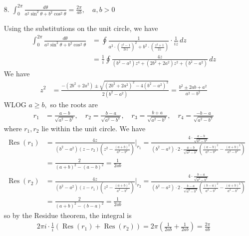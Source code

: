 \documentclass{article}
\DeclareMathOperator{\Res}{Res}
\begin{document}
\begin{itemize}
	\item[8.] $\int_0^{2\pi} \frac{d\theta}{a^2\sin^2\theta + b^2\cos^2\theta} = \frac{2\pi}{ab}, \quad a, b>0$
		\begin{soln}
			Using the substitutions on the unit circle, we have
			\begin{align*}
				\int_{0}^{2\pi} \frac{d\theta}{a^2\sin^2\theta + b^2\cos^2\theta} &= \oint \frac{1}{a^2\cdot \left( \frac{z^2-1}{2iz} \right)^2 + b^2\cdot \left( \frac{z^2+1}{2z} \right)}\cdot \frac{1}{iz}\, dz \\
				&= \frac{1}{i}\oint \frac{4z}{(b^2-a^2)z^4+(2b^2+2a^2)z^2 + (b^2-a^2)}\, dz
			\end{align*}
			We have
			\begin{align*}
				z^2 &= \frac{-(2b^2+2a^2)\pm \sqrt{(2b^2+2a^2)^2-4(b^2-a^2)^2}}{2(b^2-a^2)} = \frac{b^2\pm 2ab + a^2}{a^2-b^2}
			\end{align*}
			WLOG $a\ge b,$ so the roots are
			\begin{align*}
				r_1 &= \frac{a-b}{\sqrt{a^2-b^2}}, \quad r_2 = \frac{b-a}{\sqrt{a^2-b^2}}, \quad r_3 = \frac{b+a}{\sqrt{a^2-b^2}}, \quad r_4 = \frac{-b-a}{\sqrt{a^2-b^2}}
			\end{align*}
			where $r_1, r_2$ lie within the unit circle. We have
			\begin{align*}
				\Res(r_1) &= \frac{4z}{(b^2-a^2)(z-r_2)\left( z^2-\frac{(a+b)^2}{a^2-b^2} \right)}\Bigg\vert_{r_1} = \frac{4\cdot \frac{a-b}{\sqrt{a^2-b^2}}}{(b^2-a^2)\cdot2\cdot \frac{a-b}{\sqrt{a^2-b^2}}\left( \frac{(a-b)^2}{a^2-b^2} - \frac{(a+b)^2}{a^2-b^2} \right)} \\
				&= \frac{2}{(a+b)^2-(a-b)^2} = \frac{1}{2ab} \\
				\Res(r_2) &= \frac{4z}{(b^2-a^2)(z-r_1)\left( z^2-\frac{(a+b)^2}{a^2-b^2} \right)}\Bigg\vert_{r_2} = \frac{4\cdot \frac{b-a}{\sqrt{a^2-b^2}}}{(b^2-a^2)\cdot 2\cdot \frac{b-a}{\sqrt{a^2-b^2}}\left( \frac{(b-a)^2}{a^2-b^2} - \frac{(a+b)^2}{a^2-b^2} \right)} \\
				&= \frac{2}{(a+b)^2-(b-a)^2} = \frac{1}{2ab}
			\end{align*}
			so by the Residue theorem, the integral is
			\begin{align*}
				2\pi i\cdot \frac{1}{i}\left( \Res(r_1)+\Res(r_2) \right) = 2\pi\left( \frac{1}{2ab} + \frac{1}{2ab} \right) = \frac{2\pi}{ab}
			\end{align*}
		\end{soln}


\end{itemize}
\end{document}
